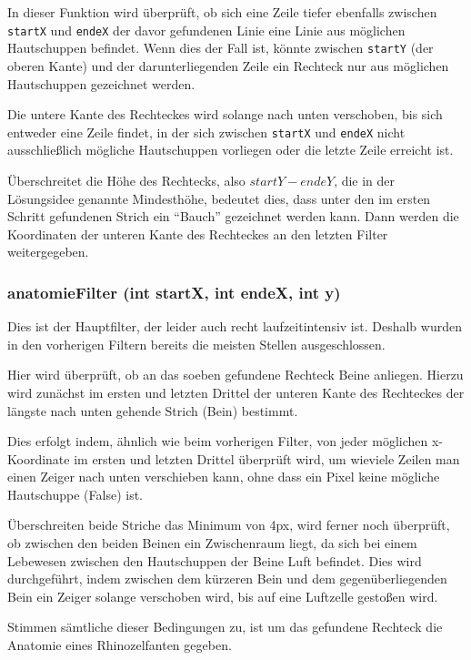 		In dieser Funktion wird überprüft, ob sich eine Zeile tiefer ebenfalls zwischen \texttt{startX} und \texttt{endeX} der davor gefundenen Linie eine Linie aus möglichen Hautschuppen befindet. Wenn dies der Fall ist, könnte zwischen \texttt{startY} (der oberen Kante) und der darunterliegenden Zeile ein Rechteck nur aus möglichen Hautschuppen gezeichnet werden. 

		Die untere Kante des Rechteckes wird solange nach unten verschoben, bis sich entweder eine Zeile findet, in der sich zwischen \texttt{startX} und \texttt{endeX} nicht ausschließlich mögliche Hautschuppen vorliegen oder die letzte Zeile erreicht ist.
		
		Überschreitet die Höhe des Rechtecks, also \(startY - endeY\), die in der Lösungsidee genannte Mindesthöhe, bedeutet dies, dass unter den im ersten Schritt gefundenen Strich ein "`Bauch"' gezeichnet werden kann. Dann werden die Koordinaten der unteren Kante des Rechteckes an den letzten Filter weitergegeben.

		\subsubsection{anatomieFilter (int startX, int endeX, int y)}
		Dies ist der Hauptfilter, der leider auch recht laufzeitintensiv ist. Deshalb wurden in den vorherigen Filtern bereits die meisten Stellen ausgeschlossen. 

		Hier wird überprüft, ob an das soeben gefundene Rechteck Beine anliegen. Hierzu wird zunächst im ersten und letzten Drittel der unteren Kante des Rechteckes der längste nach unten gehende Strich (Bein) bestimmt.

		Dies erfolgt indem, ähnlich wie beim vorherigen Filter, von jeder möglichen x-Koordinate im ersten und letzten Drittel überprüft wird, um wieviele Zeilen man einen Zeiger nach unten verschieben kann, ohne dass ein Pixel keine mögliche Hautschuppe (False) ist.
		
		Überschreiten beide Striche das Minimum von 4px, wird ferner noch überprüft, ob zwischen den beiden Beinen ein Zwischenraum liegt, da sich bei einem Lebewesen zwischen den Hautschuppen der Beine Luft befindet. Dies wird durchgeführt, indem zwischen dem kürzeren Bein und dem gegenüberliegenden Bein ein Zeiger solange verschoben wird, bis auf eine Luftzelle gestoßen wird.

		Stimmen sämtliche dieser Bedingungen zu, ist um das gefundene Rechteck die Anatomie eines Rhinozelfanten gegeben. 

